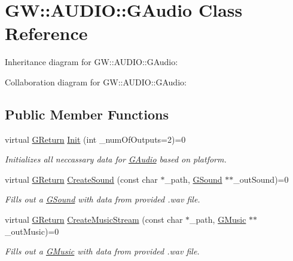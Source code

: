 \hypertarget{classGW_1_1AUDIO_1_1GAudio}{}\section{GW\+::A\+U\+D\+IO\+::G\+Audio Class Reference}
\label{classGW_1_1AUDIO_1_1GAudio}


Inheritance diagram for GW\+::A\+U\+D\+IO\+::G\+Audio\+:


Collaboration diagram for GW\+::A\+U\+D\+IO\+::G\+Audio\+:
\subsection*{Public Member Functions}
\begin{DoxyCompactItemize}
\item 
virtual \mbox{\hyperlink{namespaceGW_a67a839e3df7ea8a5c5686613a7a3de21}{G\+Return}} \mbox{\hyperlink{classGW_1_1AUDIO_1_1GAudio_ab4084083e5b785d9a8ed74f768788ca2}{Init}} (int \+\_\+num\+Of\+Outputs=2)=0
\begin{DoxyCompactList}\small\item\em Initializes all neccassary data for \mbox{\hyperlink{classGW_1_1AUDIO_1_1GAudio}{G\+Audio}} based on platform. \end{DoxyCompactList}\item 
virtual \mbox{\hyperlink{namespaceGW_a67a839e3df7ea8a5c5686613a7a3de21}{G\+Return}} \mbox{\hyperlink{classGW_1_1AUDIO_1_1GAudio_a79ca24ce2b0b0d619ea465720a702628}{Create\+Sound}} (const char $\ast$\+\_\+path, \mbox{\hyperlink{classGW_1_1AUDIO_1_1GSound}{G\+Sound}} $\ast$$\ast$\+\_\+out\+Sound)=0
\begin{DoxyCompactList}\small\item\em Fills out a \mbox{\hyperlink{classGW_1_1AUDIO_1_1GSound}{G\+Sound}} with data from provided .wav file. \end{DoxyCompactList}\item 
virtual \mbox{\hyperlink{namespaceGW_a67a839e3df7ea8a5c5686613a7a3de21}{G\+Return}} \mbox{\hyperlink{classGW_1_1AUDIO_1_1GAudio_a7a09604e225f901a67748faa3723b2c8}{Create\+Music\+Stream}} (const char $\ast$\+\_\+path, \mbox{\hyperlink{classGW_1_1AUDIO_1_1GMusic}{G\+Music}} $\ast$$\ast$\+\_\+out\+Music)=0
\begin{DoxyCompactList}\small\item\em Fills out a \mbox{\hyperlink{classGW_1_1AUDIO_1_1GMusic}{G\+Music}} with data from provided .wav file. \end{DoxyCompactList}\item 

\end{DoxyCompactItemize}
